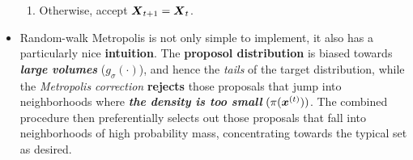 \documentclass[11pt]{article}
\begin{document}
\begin{itemize}
\begin{enumerate}
\item Otherwise, accept $\boldsymbol{X}_{t+1} = \boldsymbol{X}_{t}$.
\end{enumerate}

\item Random-walk Metropolis is not only simple to implement, it also has a particularly nice \textbf{intuition}. The \textbf{proposol distribution} is biased towards \emph{\textbf{large volumes}} ($g_{\sigma}(\cdot)$), and hence the \emph{tails} of the target distribution, while the \emph{Metropolis correction} \textbf{rejects} those proposals that jump into neighborhoods where \emph{\textbf{the density is too small}} $(\pi(\boldsymbol{x}^{(t)}))$. The combined procedure then preferentially selects out those proposals that fall into neighborhoods of high probability mass, concentrating towards the typical set as desired.
\end{itemize}
\end{document}

